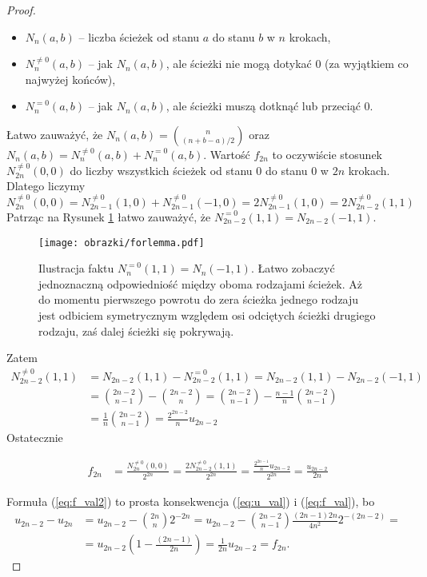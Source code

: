 \documentclass[a4paper,11pt,twoside]{book}
\theoremstyle{definition}
\begin{document}
\begin{proof}
\begin{itemize}
  \setlength\itemsep{1pt}
  \item $N_n(a,b)$ -- liczba ścieżek od stanu $a$ do stanu $b$ w $n$ krokach,
  \item $N_n^{\neq 0}(a,b)$ -- jak $N_n(a,b)$, ale ścieżki nie mogą dotykać 0 (za wyjątkiem co najwyżej końców),
  \item $N_n^{=0}(a,b)$ -- jak $N_n(a,b)$, ale ścieżki muszą dotknąć lub przeciąć 0.
\end{itemize}
Łatwo zauważyć, że $N_n(a,b) = \binom{n}{(n+b-a)/2}$ oraz $N_n(a,b) = N_n^{\neq 0}(a,b) + N_n^{= 0}(a,b)$. Wartość $f_{2n}$ to oczywiście stosunek $N_{2n}^{\neq 0}(0,0)$ do liczby wszystkich ścieżek od stanu 0 do stanu 0 w $2n$ krokach. Dlatego liczymy
\[ N_{2n}^{\neq 0}(0,0) = N_{2n-1}^{\neq 0}(1,0) + N_{2n-1}^{\neq 0}(-1,0) = 2N_{2n-1}^{\neq 0}(1,0)= 2N_{2n-2}^{\neq 0}(1,1) \]
Patrząc na Rysunek \ref{fig:forlemma} łatwo zauważyć, że $N_{2n-2}^{=0}(1,1) = N_{2n-2}(-1,1)$. 
\begin{figure}[h]
 \centering
 \texttt{[image: obrazki/forlemma.pdf]}
 \caption{Ilustracja faktu $N_n^{=0}(1,1) = N_n(-1,1)$. Łatwo zobaczyć jednoznaczną odpowiedniość między oboma rodzajami ścieżek. Aż do momentu pierwszego powrotu do zera ścieżka jednego rodzaju jest odbiciem symetrycznym względem osi odciętych ścieżki drugiego rodzaju, zaś dalej ścieżki się pokrywają.}
 \label{fig:forlemma}
\end{figure}
Zatem
\begin{equation*}
 \begin{split}
   N_{2n-2}^{\neq 0}(1,1)
   &= N_{2n-2}(1,1) - N_{2n-2}^{=0}(1,1) =  N_{2n-2}(1,1) - N_{2n-2}(-1,1) \\
   &= \binom{2n-2}{n-1} - \binom{2n-2}{n} = \binom{2n-2}{n-1} - \frac{n-1}{n}\binom{2n-2}{n-1} \\
   &= \frac{1}{n} \binom{2n-2}{n-1} = \frac{2^{2n-2}}{n} u_{2n-2}
 \end{split}
\end{equation*}
Ostatecznie

\begin{equation*}
 \begin{split}
   f_{2n} &= \frac{N_{2n}^{\neq 0}(0,0)}{2^{2n}} = \frac{2N_{2n-2}^{\neq 0}(1,1)}{2^{2n}} = \frac{\frac{2^{2n-1}}{n} u_{2n-2}}{2^{2n}} = \frac{u_{2n-2}}{2n}
 \end{split}
\end{equation*}

 Formuła (\ref{eq:f_val2}) to prosta konsekwencja (\ref{eq:u_val}) i (\ref{eq:f_val}), bo
 \begin{equation*}
 \begin{split}
    u_{2n-2} - u_{2n} &= u_{2n-2} - \binom{2n}{n}2^{-2n} =  u_{2n-2} - \binom{2n-2}{n-1} \frac{(2n-1)2n}{4n^2}2^{-(2n-2)} = \\
    &= u_{2n-2}\left(1 - \frac{(2n-1)}{2n} \right) = \frac{1}{2n} u_{2n-2} =  f_{2n}.
 \end{split}
 \end{equation*}
\end{proof}
\end{document}
